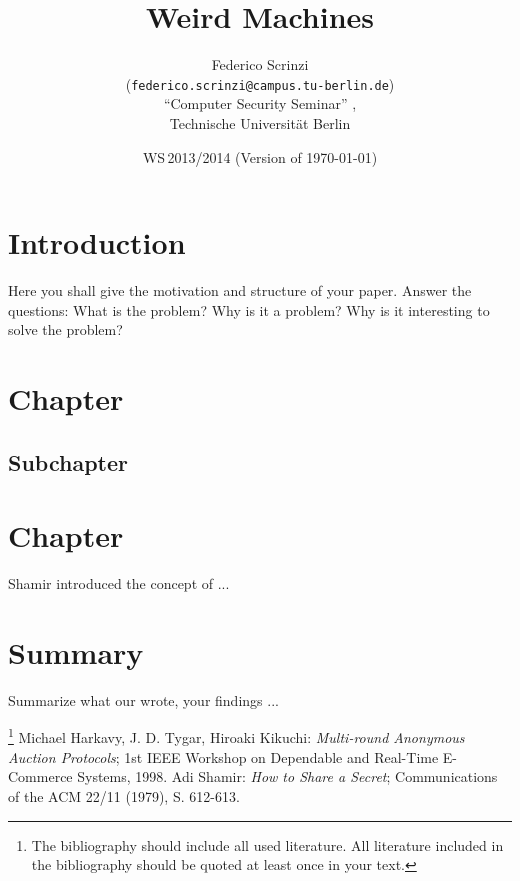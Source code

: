 \documentclass[11pt,twoside,a4paper]{article}
\begin{document}
\title{Weird Machines}
\author{Federico Scrinzi \\
  (\texttt{federico.scrinzi@campus.tu-berlin.de})\\[5mm]
  "`Computer Security Seminar"' , \\
  Technische Universität Berlin
}
  
\date{WS\,2013/2014 (Version of \today)}

\maketitle


\section{Introduction}
Here you shall give the motivation and structure of your paper. Answer the
questions: What is the problem? Why is it a problem? Why is it interesting to
solve the problem?

\section{Chapter}

\subsection{Subchapter}

\section{Chapter}

Shamir introduced \cite{sham79} the concept of ...

\section{Summary}
Summarize what our wrote, your findings ...


\begin{thebibliography}{12}
 \footnote{The bibliography should include all
used literature. All literature included in the bibliography should be quoted
at least once in your text.}
        Michael Harkavy, J. D. Tygar, Hiroaki Kikuchi: {\sl Multi-round 
        Anonymous Auction Protocols}; 1st IEEE Workshop on Dependable and 
        Real-Time E-Commerce Systems, 1998.
        Adi Shamir: {\sl How to Share a Secret}; 
        Communications of the ACM 22/11 (1979), S. 612-613.
\end{thebibliography}
\end{document}
